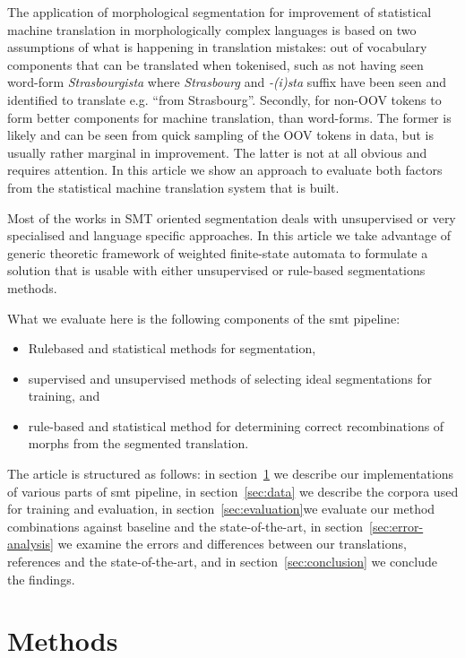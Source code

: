 \documentclass[11pt,letterpaper]{article}
\begin{document}
The application of morphological segmentation for improvement of statistical
machine translation in morphologically complex languages is based on two
assumptions of what is happening in translation mistakes: out of vocabulary
components that can be translated when tokenised, such as not having seen
word-form \emph{Strasbourgista} where \emph{Strasbourg} and \emph{-(i)sta}
suffix have been seen and identified to translate e.g. ``from Strasbourg''.
Secondly, for non-OOV tokens to form better components for machine translation,
than word-forms. The former is likely and can be seen from quick sampling of
the OOV tokens in data, but is usually rather marginal in improvement. The
latter is not at all obvious and requires attention. In this article we show
an approach to evaluate both factors from the statistical machine translation
system that is built.

Most of the works in SMT oriented segmentation deals with unsupervised or very
specialised and language specific approaches. In this article we take advantage
of generic theoretic framework of weighted finite-state automata to formulate
a solution that is usable with either unsupervised or rule-based segmentations
methods.

What we evaluate here is the following components of the smt pipeline:

\begin{itemize}
    \item Rulebased and statistical methods for segmentation,
    \item supervised and unsupervised methods of selecting ideal segmentations
        for training, and
    \item rule-based and statistical method for determining correct
        recombinations of morphs from the segmented translation.
\end{itemize}

The article is structured as follows: in section~\ref{sec:methods} we describe
our implementations of various parts of smt pipeline, in section~\ref{sec:data}
we describe the corpora used for training and evaluation, in
section~\ref{sec:evaluation}we evaluate our method combinations against
baseline and the state-of-the-art, in section~\ref{sec:error-analysis} we examine
the errors and differences between our translations, references and the
state-of-the-art, and in section~\ref{sec:conclusion} we conclude the
findings.

\section{Methods}
\label{sec:methods}
\end{document}
